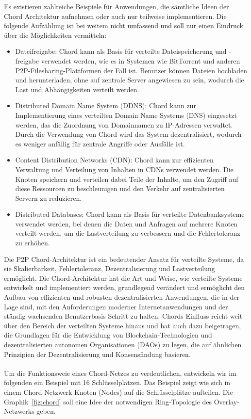 \documentclass[../vs-script-first-v01.tex]{subfiles}
\begin{document}
Es existieren zahlreiche Beispiele für Anwendungen, die sämtliche Ideen der Chord Architektur aufnehmen oder auch nur teilweise implementieren. Die folgende Aufzählung ist bei weitem nicht umfassend und soll nur einen Eindruck über die Möglichkeiten vermitteln:
\begin{itemize} 
\item Dateifreigabe: Chord kann als Basis für verteilte Dateispeicherung und -freigabe verwendet werden, wie es in Systemen wie BitTorrent und anderen P2P-Filesharing-Plattformen der Fall ist. Benutzer können Dateien hochladen und herunterladen, ohne auf zentrale Server angewiesen zu sein, wodurch die Last und Abhängigkeiten verteilt werden.
\item Distributed Domain Name System (DDNS): Chord kann zur Implementierung eines verteilten Domain Name Systems (DNS) eingesetzt werden, das die Zuordnung von Domainnamen zu IP-Adressen verwaltet. Durch die Verwendung von Chord wird das System dezentralisiert, wodurch es weniger anfällig für zentrale Angriffe oder Ausfälle ist.
\item Content Distribution Networks (CDN): Chord kann zur effizienten Verwaltung und Verteilung von Inhalten in CDNs verwendet werden. Die Knoten speichern und verteilen dabei Teile der Inhalte, um den Zugriff auf diese Ressourcen zu beschleunigen und den Verkehr auf zentralisierten Servern zu reduzieren.
\item Distributed Databases: Chord kann als Basis für verteilte Datenbanksysteme verwendet werden, bei denen die Daten und Anfragen auf mehrere Knoten verteilt werden, um die Lastverteilung zu verbessern und die Fehlertoleranz zu erhöhen.
\end{itemize}     

Die P2P Chord-Architektur ist ein bedeutender Ansatz für verteilte Systeme, da sie Skalierbarkeit, Fehlertoleranz, Dezentralisierung und Lastverteilung ermöglicht.  Die Chord-Architektur hat die Art und Weise, wie verteilte Systeme entwickelt und implementiert werden, grundlegend verändert und ermöglicht den Aufbau von effizienten und robusten dezentralisierten Anwendungen, die in der Lage sind, mit den Anforderungen moderner Internetanwendungen und der ständig wachsenden Benutzerbasis Schritt zu halten. Chords Einfluss reicht weit über den Bereich der verteilten Systeme hinaus und hat auch dazu beigetragen, die Grundlagen für die Entwicklung von Blockchain-Technologien und dezentralisierten autonomen Organisationen (DAOs) zu legen, die auf ähnlichen Prinzipien der Dezentralisierung und Konsensfindung basieren.
\\\\
Um die Funktionsweie eines Chord-Netzes zu verdeutlichen, entwickeln wir im folgenden ein Beispiel mit 16 Schlüsselplätzen. Das Beispiel zeigt wie sich in einem Chord-Netzwerk Knoten (Nodes) auf die Schlüsselplätze aufteilen.
Die Graphik~\ref{fig:chord} soll eine Idee der notwendigen Ring-Topologie des Overlay-Netzwerks geben.  
\end{document}
